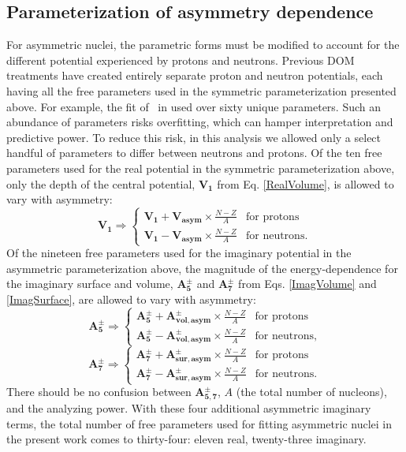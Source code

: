 \subsection{Parameterization of asymmetry dependence}
For asymmetric nuclei,
the parametric forms must be modified to account for the different potential experienced by 
protons and neutrons. Previous DOM treatments have created entirely separate
proton and neutron potentials, each having all the free parameters used in the symmetric
parameterization presented above. For example, the fit of \caEight\ in
\cite{MahzoonPhDThesis} used over sixty unique parameters. Such an abundance of
parameters risks overfitting, which can hamper interpretation and predictive power.
To reduce this risk, in this analysis we allowed only a select handful of parameters
to differ between neutrons and protons. Of the ten free parameters used for the real potential
in the symmetric parameterization above,
only the depth of the central potential,
$\bm{V_{1}}$ from Eq. \ref{RealVolume}, is allowed to vary with asymmetry:
\begin{equation}
    \bm{V_{1}} \Rightarrow \begin{cases}
        \bm{V_{1}} + \bm{V_{asym}}\times\frac{N-Z}{A} & \text{for protons}\\
        \bm{V_{1}} - \bm{V_{asym}}\times\frac{N-Z}{A} & \text{for neutrons}.
    \end{cases}
\end{equation}
Of the nineteen free parameters used for the imaginary potential in the asymmetric parameterization
above, the magnitude of the energy-dependence for the imaginary surface and volume,
$\bm{A_{5}^{\pm}}$ and $\bm{A_{7}^{\pm}}$ from Eqs. \ref{ImagVolume} and \ref{ImagSurface},
are allowed to vary with asymmetry:
\begin{equation}
    \bm{A_{5}^{\pm}} \Rightarrow \begin{cases}
        \bm{A_{5}^{\pm}} + \bm{A_{vol, asym}^{\pm}}\times\frac{N-Z}{A} & \text{for protons}\\
        \bm{A_{5}^{\pm}} - \bm{A_{vol, asym}^{\pm}}\times\frac{N-Z}{A} & \text{for neutrons},
    \end{cases}
\end{equation}
\begin{equation}
    \bm{A_{7}^{\pm}} \Rightarrow \begin{cases}
        \bm{A_{7}^{\pm}} + \bm{A_{sur, asym}^{\pm}}\times\frac{N-Z}{A} & \text{for protons}\\
        \bm{A_{7}^{\pm}} - \bm{A_{sur, asym}^{\pm}}\times\frac{N-Z}{A} & \text{for neutrons}.
    \end{cases}
\end{equation}
There should be no confusion between $\bm{A_{5,7}^{\pm}}$, $A$ (the total number
of nucleons), and the analyzing power. 
With these four additional asymmetric imaginary terms, the total number of
free parameters used for
fitting asymmetric nuclei in the present work comes to thirty-four: eleven real, twenty-three imaginary.

